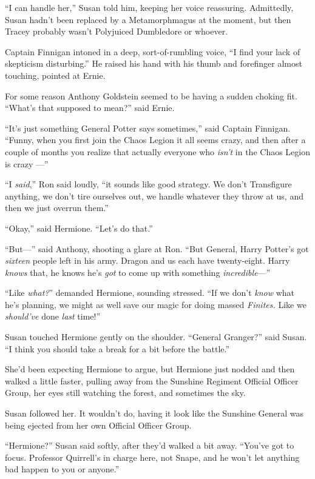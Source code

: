 “I can handle her,” Susan told him, keeping her voice
reassuring. Admittedly, Susan hadn’t been replaced by a
Metamorphmagus at the moment, but then Tracey probably wasn’t
Polyjuiced Dumbledore or whoever.

Captain Finnigan intoned in a deep, sort-of-rumbling voice, “I
find your lack of skepticism disturbing.” He raised his hand with
his thumb and forefinger almost touching, pointed at Ernie.

For some reason Anthony Goldstein seemed to be having a sudden
choking fit. “What’s that supposed to mean?” said Ernie.

“It’s just something General Potter says sometimes,” said
Captain Finnigan. “Funny, when you first join the Chaos Legion it
all seems crazy, and then after a couple of months you realize that
actually everyone who \emph{isn’t} in the Chaos Legion is crazy
—”

“I \emph{said},” Ron said loudly, “it sounds like good strategy.
We don’t Transfigure anything, we don’t tire ourselves out, we
handle whatever they throw at us, and then we just overrun
them.”

“Okay,” said Hermione. “Let’s do that.”

“But—” said Anthony, shooting a glare at Ron. “But General,
Harry Potter’s got \emph{sixteen} people left in his army. Dragon
and us each have twenty-eight. Harry \emph{knows} that, he knows
he’s \emph{got} to come up with something \emph{incredible}—”

“Like \emph{what?}” demanded Hermione, sounding stressed. “If we
don’t \emph{know} what he’s planning, we might as well save our
magic for doing massed \emph{Finites.} Like we \emph{should’ve}
done \emph{last} time!”

Susan touched Hermione gently on the shoulder. “General
Granger?” said Susan. “I think you should take a break for a bit
before the battle.”

She’d been expecting Hermione to argue, but Hermione just nodded
and then walked a little faster, pulling away from the Sunshine
Regiment Official Officer Group, her eyes still watching the
forest, and sometimes the sky.

Susan followed her. It wouldn’t do, having it look like the
Sunshine General was being ejected from her own Official Officer
Group.

“Hermione?” Susan said softly, after they’d walked a bit away.
“You’ve got to focus. Professor Quirrell’s in charge here, not
Snape, and he won’t let anything bad happen to you or anyone.”

